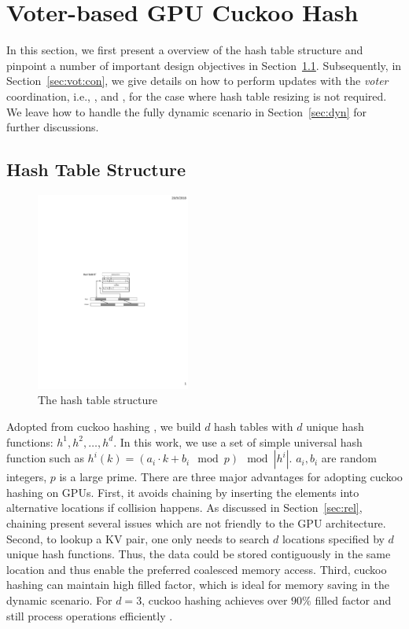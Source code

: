 \section{Voter-based GPU Cuckoo Hash}\label{sec:vot}
In this section, we first present a overview of the hash table structure and pinpoint a number of important design objectives in Section~\ref{sec:vot:has}.
Subsequently, in Section~\ref{sec:vot:con}, we give details on how to perform updates with the \emph{voter} coordination, i.e., ,  and , for the case where hash table resizing is not required. 
We leave how to handle the fully dynamic scenario in Section~\ref{sec:dyn} for further discussions. 


\subsection{Hash Table Structure}\label{sec:vot:has}
\begin{figure}[t]
	\centering
	\includegraphics[width=0.45\textwidth]{fig/Hashtable.pdf}
	\caption{The hash table structure}
	\label{fig:hashtable}
\end{figure}

Adopted from cuckoo hashing \cite{}, we build $d$ hash tables with $d$ unique hash functions: $h^1,h^2,\ldots,h^d$. 
In this work, we use a set of simple universal hash function such as $h^i(k) = (a_i\cdot k + b_i \mod p) \mod |h^i|$.
$a_i,b_i$ are random integers, $p$ is a large prime.
There are three major advantages for adopting cuckoo hashing on GPUs. 
First, it avoids chaining by inserting the elements into alternative locations if collision happens. As discussed in Section~\ref{sec:rel}, 
chaining present several issues which are not friendly to the GPU architecture.  
Second, to lookup a KV pair, one only needs to search $d$ locations specified by $d$ unique hash functions. 
Thus, the data could be stored contiguously in the same location and thus enable the preferred coalesced memory access. 
Third, cuckoo hashing can maintain high filled factor, which is ideal for memory saving in the dynamic scenario. 
For $d=3$, cuckoo hashing achieves over $90\%$ filled factor and still process  operations efficiently \cite{fotakis2005space}.

